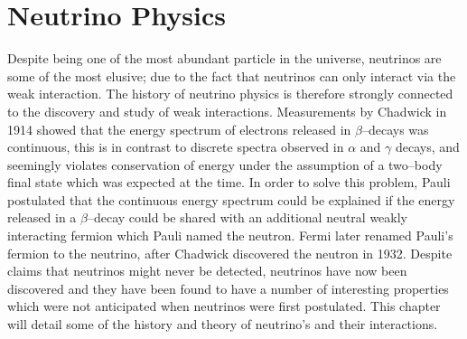 \chapter{\label{ch:2-neutrinophysics}Neutrino Physics} 


 



Despite being one of the most abundant particle in the universe, neutrinos are 
some of the most elusive; due to the fact that neutrinos can only interact via
the weak interaction. The history of neutrino physics is therefore strongly
connected to the discovery and study of weak interactions. Measurements by
Chadwick in 1914 showed that the energy spectrum of electrons released in
\(\beta\)--decays was continuous, this is in contrast to discrete spectra
observed in \(\alpha\) and \(\gamma\) decays, and seemingly violates
conservation of energy under the assumption of a two--body final state which was
expected at the time. In order to solve this problem, Pauli postulated that the 
continuous energy spectrum could be explained if the energy released in a 
\(\beta\)--decay could be shared with an additional neutral weakly interacting 
fermion which Pauli named the neutron. Fermi later renamed Pauli's fermion to 
the neutrino, after Chadwick discovered the neutron in 1932. Despite claims that 
neutrinos might never be detected, neutrinos have now been discovered and they 
have been found to have a number of interesting properties which were not 
anticipated when neutrinos were first postulated. This chapter will detail 
some of the history and theory of neutrino's and their interactions.

